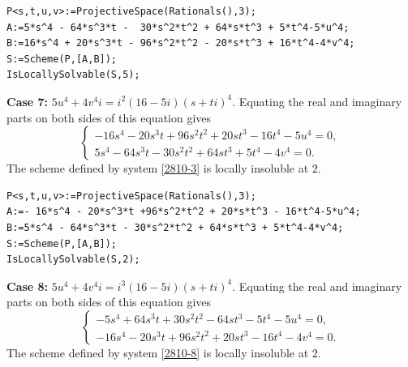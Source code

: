 \documentclass[a4paper,12pt,english,reqno]{amsart}
\begin{document}

\begin{lstlisting}
P<s,t,u,v>:=ProjectiveSpace(Rationals(),3);
A:=5*s^4 - 64*s^3*t -  30*s^2*t^2 + 64*s*t^3 + 5*t^4-5*u^4;
B:=16*s^4 + 20*s^3*t - 96*s^2*t^2 - 20*s*t^3 + 16*t^4-4*v^4;
S:=Scheme(P,[A,B]);
IsLocallySolvable(S,5);
\end{lstlisting}

{\bf Case 7:} $5u^4+4v^4i=i^{2}(16-5i)(s+ti)^4$. Equating the real and imaginary parts on both sides of this equation gives
\begin{equation}\label{2810-7}
\begin{cases}
-16s^4 - 20s^3t + 96s^2t^2 + 20st^3 - 16t^4 - 5u^4=0,\\
5s^4 - 64s^3t - 30s^2t^2 + 64st^3 + 5t^4 - 4v^4=0.
\end{cases}
\end{equation}
The scheme defined by system \eqref{2810-3} is locally insoluble at $2$.


\begin{lstlisting}
P<s,t,u,v>:=ProjectiveSpace(Rationals(),3);
A:=- 16*s^4 - 20*s^3*t +96*s^2*t^2 + 20*s*t^3 - 16*t^4-5*u^4;
B:=5*s^4 - 64*s^3*t - 30*s^2*t^2 + 64*s*t^3 + 5*t^4-4*v^4;
S:=Scheme(P,[A,B]);
IsLocallySolvable(S,2);
\end{lstlisting}

{\bf Case 8:} $5u^4+4v^4i=i^{3}(16-5i)(s+ti)^4$. Equating the real and imaginary parts on both sides of this equation gives
\begin{equation}\label{2810-8}
\begin{cases}
-5s^4 + 64s^3t + 30s^2t^2 - 64st^3 - 5t^4 - 5u^4=0,\\
-16s^4 - 20s^3t + 96s^2t^2 + 20st^3 - 16t^4 - 4v^4=0.
\end{cases}
\end{equation}
The scheme defined by system \eqref{2810-8} is locally insoluble at $2$.
\end{document}
